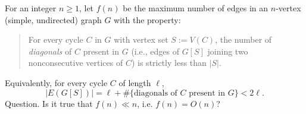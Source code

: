 For an integer $n\ge 1$, let $f(n)$ be the maximum number of edges in an $n$-vertex (simple, undirected) graph $G$ with the property:

\begin{quote}
For every cycle $C$ in $G$ with vertex set $S:=V(C)$, the number of \emph{diagonals} of $C$ present in $G$ (i.e., edges of $G[S]$ joining two nonconsecutive vertices of $C$) is strictly less than $|S|$.
\end{quote}
Equivalently, for every cycle $C$ of length $\ell$,
\[
  |E(G[S])| = \ell + \#\{\text{diagonals of $C$ present in }G\} < 2\ell.
\]
Question. Is it true that $f(n)\ll n$, i.e. $f(n)=O(n)$?
